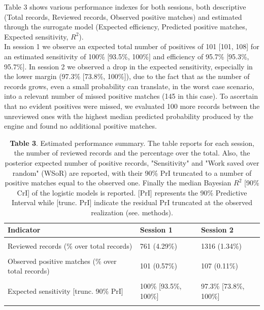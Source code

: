 \documentclass{article}
\begin{document}
Table 3 shows various performance indexes for both sessions, both
descriptive (Total records, Reviewed records, Observed positive matches)
and estimated through the surrogate model (Expected efficiency,
Predicted positive matches, Expected sensitivity, \(R^2\)).\\
In session 1 we observe an expected total number of positives of 101
{[}101, 108{]} for an estimated sensitivity of 100\% {[}93.5\%, 100\%{]}
and efficiency of 95.7\% {[}95.3\%, 95.7\%{]}. In session 2 we observed
a drop in the expected sensitivity, especially in the lower margin
(97.3\% {[}73.8\%, 100\%{]}), due to the fact that as the number of
records grows, even a small probability can translate, in the worst case
scenario, into a relevant number of missed positive matches (145 in this
case). To ascertain that no evident positives were missed, we evaluated
100 more records between the unreviewed ones with the highest median
predicted probability produced by the engine and found no additional
positive matches.

\begin{table}[!h]

\caption{\label{tab:performance}\textbf{Table 3}. Estimated performance summary. The table reports for each session, the number of reviewed records and the percentage over the total. Also, the posterior expected number of positive records, "Sensitivity" and "Work saved over random" (WSoR) are reported, with their 90\% PrI truncated to a number of positive matches equal to the observed one. Finally the median Bayesian $R^2$ [90\% CrI] of the logistic models is reported. [PrI] represents the 90\% Predictive Interval while [trunc. PrI] indicate the residual PrI truncated at the observed realization (see. methods).}
\centering
\begin{tabular}[t]{lll}
\toprule
Indicator & Session 1 & Session 2\\
\midrule
\cellcolor{gray!6}{Total records} & \cellcolor{gray!6}{17755} & \cellcolor{gray!6}{98371}\\
Reviewed records (\% over total records) & 761 (4.29\%) & 1316 (1.34\%)\\
\cellcolor{gray!6}{Expected efficiency (over random) [trunc. 90\% PrI]} & \cellcolor{gray!6}{95.7\% [95.3\%, 95.7\%]} & \cellcolor{gray!6}{98.6\% [98.2\%, 98.7\%]}\\
Observed positive matches (\% over total records) & 101 (0.57\%) & 107 (0.11\%)\\
\cellcolor{gray!6}{Predicted positive matches [trunc. 90\% PrI]} & \cellcolor{gray!6}{101 [101, 108]} & \cellcolor{gray!6}{110 [107, 145]}\\
\addlinespace
Expected sensitivity [trunc. 90\% PrI] & 100\% [93.5\%, 100\%] & 97.3\% [73.8\%, 100\%]\\
\cellcolor{gray!6}{Simple Model $R^2$ [90\% PrI]} & \cellcolor{gray!6}{98.1\% [97.4\%, 98.3\%]} & \cellcolor{gray!6}{98.2\% [97.6\%, 98.3\%]}\\
\bottomrule
\end{tabular}
\end{table}
\end{document}
